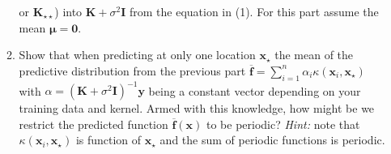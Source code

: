 \documentclass[letter, 12pt]{article}
\begin{document}
\begin{enumerate}
\begin{enumerate}
            or $\mathbf{K}_{\star\star}$) into $\mathbf{K} + \sigma^2\mathbf{I}$
            from the equation in (1). For this part assume the mean $\boldsymbol{\mu}=
            \mathbf{0}$.\vfill
        \item Show that when predicting at only one location $\mathbf{x}_\star$ the
            mean of the predictive distribution from the previous part
            $\overline{\mathbf{f}} = \sum_{i=1}^n \alpha_i
            \kappa(\mathbf{x}_i,\mathbf{x}_\star)$ with $\alpha = (\mathbf{K} + \sigma^2
            \mathbf{I})^{-1}\mathbf{y}$ being a constant vector depending on your training
            data and kernel. Armed with this knowledge, how might be we restrict
            the predicted function $\overline{\mathbf{f}}(\mathbf{x})$ to be periodic?
            \textit{Hint:} note that $\kappa(\mathbf{x}_i,\mathbf{x}_\star)$ is function of
            $\mathbf{x}_\star$ and the sum of periodic functions is periodic.
            \vfill
    \end{enumerate}
    \clearpage
\end{enumerate}
\end{document}
